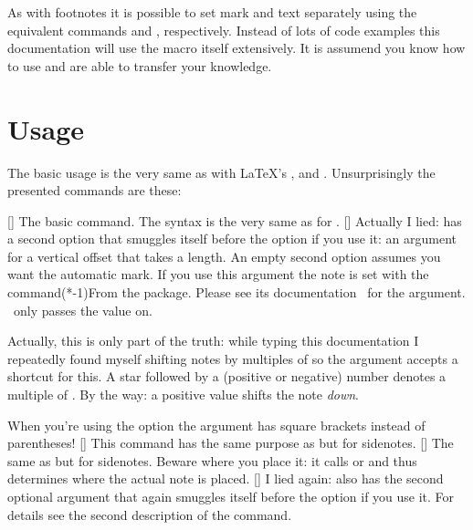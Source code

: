 \documentclass[load-preamble+]{cnltx-doc}
\begin{document}
As with footnotes it is possible to set mark and text separately using the
equivalent commands  and , respectively.
Instead of lots of code examples this documentation will use the 
macro itself extensively.  It is assumend you know how to use 
and are able to transfer your knowledge.

\section{Usage}\label{sec:usage}
The basic usage is the very same as with \LaTeX's ,
 and .  Unsurprisingly the presented
commands are these:
\begin{commands}
  []
    The basic command.  The syntax is the very same as for .
  []
    Actually I lied:  has a second option that smuggles itself
    before the  option if you use it: an argument for a vertical
    offset that takes a length. An empty second option assumes you want the
    automatic mark.  If you use this argument the note is set with the
     command\sidenote(*-1){From the 
      package}.  Please see its documentation~\cite{pkg:marginnote}
    for the  argument.  \snotez\ only passes the value on.
    
    Actually, this is only part of the truth: while typing this documentation
    I repeatedly found myself shifting notes by multiples of
     so the argument accepts a shortcut for this.  A star
    \code{*} followed by a (positive or negative) number denotes a multiple of
    .  By the way: a positive value shifts the note
    \emph{down}.
    
    When you're using the  option the 
    argument has square brackets instead of parentheses!
  []
    This command has the same purpose as  but for
    sidenotes.
  []
    The same as  but for sidenotes.  Beware where you place
    it: it calls  or  and thus determines where
    the actual note is placed.
  []
    I lied again:  also has the second optional argument
     that again smuggles itself before the  option if
    you use it.  For details see the second description of the 
    command.
\end{commands}
\end{document}
